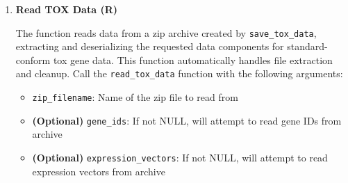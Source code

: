 \begin{enumerate}
\begin{itemize}
    \item \textbf{(Optional)} \texttt{family\_ids\_name}: Filename for
          family IDs in the archive
          
    \item \textbf{(Optional)} \texttt{family\_centroids}: Numeric matrix of
          family centroids (n\_samples × n\_families)
          
    \item \textbf{(Optional)} \texttt{family\_centroids\_name}: Filename for
          family centroids in the archive
          
    \item \textbf{(Optional)} \texttt{shift\_vectors}: Numeric matrix of
          shift vectors (2*n\_samples × n\_genes)
          
    \item \textbf{(Optional)} \texttt{shift\_vectors\_name}: Filename for
          shift vectors in the archive
\end{itemize}

\begin{lstlisting}[language=R, caption={R Save TOX Data}]
save_tox_data(zip_filename,
              gene_ids = NULL, gene_ids_name = NULL,
              expression_vectors = NULL, expression_vectors_name = NULL,
              gene_to_fam = NULL, gene_to_fam_name = NULL,
              family_ids = NULL, family_ids_name = NULL,
              family_centroids = NULL, family_centroids_name = NULL,
              shift_vectors = NULL, shift_vectors_name = NULL)
\end{lstlisting}

\item \textbf{Read TOX Data (R)}

The function reads data from a zip archive created by \texttt{save\_tox\_data},
extracting and deserializing the requested data components for standard-conform
tox gene data. This function automatically handles file extraction and
cleanup. Call the \texttt{read\_tox\_data} function with the following
arguments:

\begin{itemize}
    \item \texttt{zip\_filename}: Name of the zip file to read from
          
    \item \textbf{(Optional)} \texttt{gene\_ids}: If not NULL, will attempt to
          read gene IDs from archive
          
    \item \textbf{(Optional)} \texttt{expression\_vectors}: If not NULL, will
          attempt to read expression vectors from archive
          

\end{itemize}
\end{enumerate}
